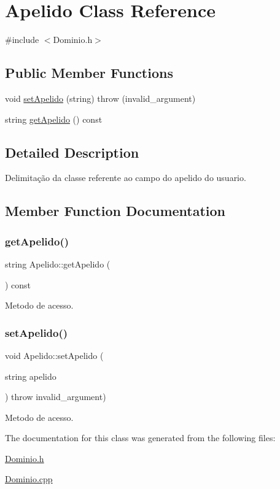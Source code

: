 \hypertarget{class_apelido}{}\section{Apelido Class Reference}
\label{class_apelido}


{\ttfamily \#include $<$Dominio.\+h$>$}

\subsection*{Public Member Functions}
\begin{DoxyCompactItemize}
\item 
void \hyperlink{class_apelido_a2cb01229e3c1120858ef6c1f692432da}{set\+Apelido} (string)  throw (invalid\+\_\+argument)
\item 
string \hyperlink{class_apelido_af3547459a5aff2cd4d6e2befe69ffe12}{get\+Apelido} () const
\end{DoxyCompactItemize}


\subsection{Detailed Description}
Delimitação da classe referente ao campo do apelido do usuario. 

\subsection{Member Function Documentation}
\mbox{\label{class_apelido_af3547459a5aff2cd4d6e2befe69ffe12}} 
\subsubsection{\texorpdfstring{get\+Apelido()}{getApelido()}}
{\footnotesize\ttfamily string Apelido\+::get\+Apelido (\begin{DoxyParamCaption}{ }\end{DoxyParamCaption}) const\hspace{0.3cm}{\ttfamily [inline]}}

Metodo de acesso. \mbox{\label{class_apelido_a2cb01229e3c1120858ef6c1f692432da}} 
\subsubsection{\texorpdfstring{set\+Apelido()}{setApelido()}}
{\footnotesize\ttfamily void Apelido\+::set\+Apelido (\begin{DoxyParamCaption}\item[{string}]{apelido }\end{DoxyParamCaption}) throw  invalid\+\_\+argument) }

Metodo de acesso. 

The documentation for this class was generated from the following files\+:\begin{DoxyCompactItemize}
\item 
\hyperlink{_dominio_8h}{Dominio.\+h}\item 
\hyperlink{_dominio_8cpp}{Dominio.\+cpp}\end{DoxyCompactItemize}

